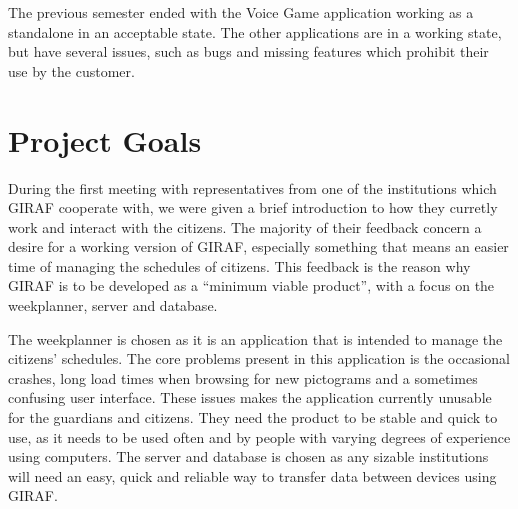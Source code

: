 The previous semester ended with the Voice Game application working as a
standalone in an acceptable state. The other applications are in a working
state, but have several issues, such as bugs and missing features which
prohibit their use by the customer.
  
\section{Project Goals}
During the first meeting with representatives from one of the institutions which
GIRAF cooperate with, we were given a brief introduction to how they curretly
work and interact with the citizens. The majority of their feedback concern a
desire for a working version of GIRAF, especially something that means an
easier time of managing the schedules of citizens. This feedback is the reason
why GIRAF is to be developed as a ``minimum viable product'', with a focus on
the weekplanner, server and database.\nl

The weekplanner is chosen as it is an application that is intended to manage
the citizens' schedules. The core problems present in this application is
the occasional crashes, long load times when browsing for new pictograms and a
sometimes confusing user interface. These issues makes the application currently
unusable for the guardians and citizens. They need the product to be stable and
quick to use, as it needs to be used often and by people with varying degrees of
experience using computers. The server and database is chosen as any sizable
institutions will need an easy, quick and reliable way to transfer data between
devices using GIRAF.


